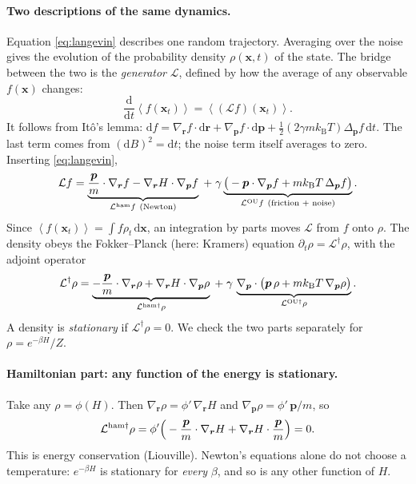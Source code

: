 \documentclass[11pt,a4paper]{article}
\newcommand{\kT}{k_{\mathrm B}T}
\newcommand{\dd}{\mathrm{d}}
\newcommand{\avg}[1]{\left\langle #1\right\rangle}
\begin{document}
\paragraph{Two descriptions of the same dynamics.} Equation \eqref{eq:langevin} describes one random
trajectory. Averaging over the noise gives the evolution of the probability density $\rho(\bm x,t)$
of the state. The bridge between the two is the \emph{generator} $\mathcal L$, defined by how the
average of any observable $f(\bm x)$ changes:
\begin{equation}
\frac{\dd}{\dd t}\avg{f(\bm x_t)}=\avg{(\mathcal Lf)(\bm x_t)} .
\end{equation}
It follows from It\^o's lemma: $\dd f=\nabla_{\bm r}f\cdot\dd\bm r+\nabla_{\bm p}f\cdot\dd\bm p
+\tfrac12(2\gamma m\kT)\Delta_{\bm p}f\,\dd t$. The last term comes from $(\dd B)^2=\dd t$; the noise term
itself averages to zero. Inserting \eqref{eq:langevin},
\begin{equation}
\mathcal Lf=\underbrace{\frac{\bm p}{m}\cdot\nabla_{\bm r}f-\nabla_{\bm r}H\cdot\nabla_{\bm p}f}_{\mathcal L^{\rm ham}f\ \text{(Newton)}}
\;+\;\gamma\underbrace{\big(-\bm p\cdot\nabla_{\bm p}f+m\kT\,\Delta_{\bm p}f\big)}_{\mathcal L^{\rm OU}f\ \text{(friction + noise)}} .
\end{equation}
Since $\avg{f(\bm x_t)}=\int f\rho_t\,\dd\bm x$, an integration by parts moves $\mathcal L$ from $f$ onto
$\rho$. The density obeys the Fokker--Planck (here: Kramers) equation $\partial_t\rho=\mathcal L^\dagger\rho$, with the
adjoint operator
\begin{equation}
\mathcal L^\dagger\rho=\underbrace{-\frac{\bm p}{m}\cdot\nabla_{\bm r}\rho+\nabla_{\bm r}H\cdot\nabla_{\bm p}\rho}_{\mathcal L^{\rm ham\dagger}\rho}
\;+\;\gamma\,\underbrace{\nabla_{\bm p}\cdot\big(\bm p\,\rho+m\kT\,\nabla_{\bm p}\rho\big)}_{\mathcal L^{\rm OU\dagger}\rho}.
\end{equation}
A density is \emph{stationary} if $\mathcal L^\dagger\rho=0$. We check the two parts separately for $\rho=e^{-\beta H}/Z$.

\paragraph{Hamiltonian part: any function of the energy is stationary.} Take any $\rho=\phi(H)$.
Then $\nabla_{\bm r}\rho=\phi'\,\nabla_{\bm r}H$ and $\nabla_{\bm p}\rho=\phi'\,\bm p/m$, so
\[
\mathcal L^{\rm ham\dagger}\rho=\phi'\Big(-\frac{\bm p}{m}\cdot\nabla_{\bm r}H+\nabla_{\bm r}H\cdot\frac{\bm p}{m}\Big)=0 .
\]
This is energy conservation (Liouville). Newton's equations alone do not choose a temperature:
$e^{-\beta H}$ is stationary for \emph{every} $\beta$, and so is any other function of $H$.
\end{document}
